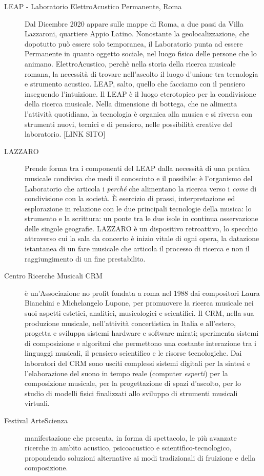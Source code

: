 \documentclass{gs-adonis}
\begin{document}
\begin{description}
  \item[LEAP - Laboratorio ElettroAcustico Permanente, Roma] Dal Dicembre 2020
  appare sulle mappe di Roma, a due passi da Villa Lazzaroni, quartiere Appio
  Latino. Nonostante la geolocalizzazione, che dopotutto può essere solo
  temporanea, il Laboratorio punta ad essere Permanente in quanto oggetto sociale,
  nel luogo fisico delle persone che lo animano. ElettroAcustico, perchè nella
  storia della ricerca musicale romana, la necessità di trovare nell'ascolto
  il luogo d'unione tra tecnologia e strumento acustico. LEAP, salto, quello che
  facciamo con il pensiero inseguendo l'intuizione.
  Il LEAP è il luogo eterotopico per la condivisione della ricerca musicale.
  Nella dimensione di bottega, che ne alimenta l'attività quotidiana, la tecnologia
  è organica alla musica e si riversa con strumenti nuovi, tecnici e di pensiero,
  nelle possibilità creative del laboratorio. [LINK SITO]
  \item[LAZZARO] Prende forma tra i componenti del LEAP dalla necessità di una
  pratica musicale condivisa che medi il conosciuto e il possibile: è l'organismo
  del Laboratorio che articola i \emph{perché} che alimentano la ricerca verso
  i \emph{come} di condivisione con la società. È esercizio di prassi, interpretazione
  ed esplorazione in relazione con le due principali tecnologie della musica: lo
  strumento e la scrittura: un ponte tra le due isole in continua osservazione
  delle singole geografie. LAZZARO è un dispositivo retroattivo, lo specchio
  attraverso cui la sala da concerto è inizio vitale di ogni opera, la datazione
  istantanea di un fare musicale che articola il processo di ricerca e non il
  raggiungimento di un fine prestabilito.
  \item[Centro Ricerche Musicali CRM] è un'Associazione no profit fondata a roma
  nel 1988 dai compositori Laura Bianchini e Michelangelo Lupone, per promuovere
  la ricerca musicale nei suoi aspetti estetici, analitici, musicologici e scientifici.
  Il CRM, nella sua produzione musicale, nell'attività concertistica in Italia e
  all'estero, progetta e sviluppa sistemi hardware e software mirati; sperimenta
  sistemi di composizione e algoritmi che permettono una costante interazione tra
  i linguaggi musicali, il pensiero scientifico e le risorse tecnologiche.
  Dai laboratori del CRM sono usciti complessi sistemi digitali per la sintesi
  e l'elaborazione del suono in tempo reale (computer \emph{esperti}) per la
  composizione musicale, per la progettazione di spazi d'ascolto, per lo studio
  di modelli fisici finalizzati allo sviluppo di strumenti musicali virtuali.
  \item[Festival ArteScienza] manifestazione che presenta, in forma di spettacolo,
  le più avanzate ricerche in ambito acustico, psicoacustico e scientifico-tecnologico,
  propondendo soluzioni alternative ai modi tradizionali di fruizione e della composizione.
\end{description}
\end{document}
